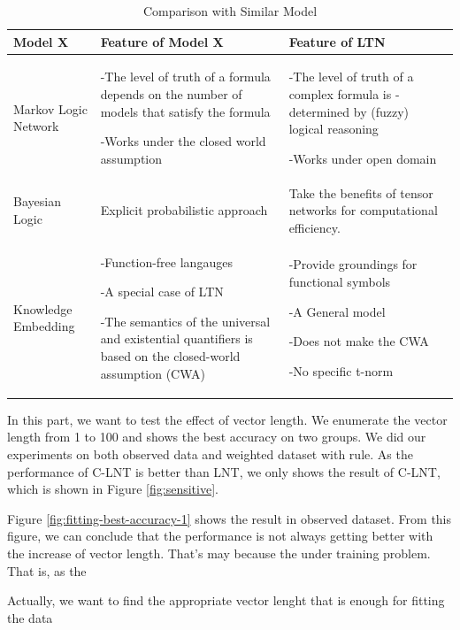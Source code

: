 \begin{table}[t]
    \centering
    \begin{tabularx}{\textwidth}{L{0.2\textwidth}|L{0.35\textwidth}|L{0.35\textwidth}}
        \toprule
        Model X & Feature of Model X  & Feature of LTN \\
        \midrule
        Markov Logic \newline Network \cite{wang2008hybrid}
        &
        -The level of truth of a formula depends on the number of models that satisfy the formula

        -Works under the closed world assumption
        &
        -The level of truth of a complex formula is -determined by (fuzzy) logical reasoning

        -Works under open domain
        \\
        \midrule
        Bayesian Logic \cite{milch20071}
        &
        Explicit probabilistic approach
        &
        Take the benefits of tensor networks for computational efficiency.
        \\
        \midrule
        Knowledge \newline Embedding \cite{rocktaschel2015injecting}
        &
        -Function-free langauges

        -A special case of LTN

        -The semantics of the universal and existential quantifiers is based on the closed-world assumption (CWA)

        &
        -Provide groundings for functional symbols

        -A General model

        -Does not make the CWA

        -No specific t-norm
        \\
        \bottomrule
    \end{tabularx}
    \caption{Comparison with Similar Model}
    \label{tab:compare}
\end{table}

In this part, we want to test the effect of vector length. We enumerate the vector length from 1 to 100 and shows the best accuracy on two groups. We did our experiments on both observed data and weighted dataset with rule. As the performance of C-LNT is better than LNT, we only shows the result of C-LNT, which is shown in Figure \ref{fig:sensitive}.

Figure \ref{fig:fitting-best-accuracy-1} shows the result in observed dataset.
From this figure, we can conclude that the performance is not always getting better with the increase of vector length. That's may because the under training problem. That is, as the

Actually, we want to find the appropriate vector lenght that is enough for fitting the data
